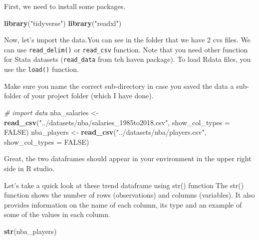 \documentclass[
]{book}
\newenvironment{Shaded}{\begin{snugshade}}{\end{snugshade}}
\newcommand{\AttributeTok}[1]{\textcolor[rgb]{0.13,0.29,0.53}{#1}}
\newcommand{\CommentTok}[1]{\textcolor[rgb]{0.56,0.35,0.01}{\textit{#1}}}
\newcommand{\ConstantTok}[1]{\textcolor[rgb]{0.56,0.35,0.01}{#1}}
\newcommand{\FunctionTok}[1]{\textcolor[rgb]{0.13,0.29,0.53}{\textbf{#1}}}
\newcommand{\NormalTok}[1]{#1}
\newcommand{\OtherTok}[1]{\textcolor[rgb]{0.56,0.35,0.01}{#1}}
\newcommand{\StringTok}[1]{\textcolor[rgb]{0.31,0.60,0.02}{#1}}
\begin{document}
First, we need to install some packages.

\begin{Shaded}
\begin{Highlighting}[]
\FunctionTok{library}\NormalTok{(}\StringTok{"tidyverse"}\NormalTok{)}
\FunctionTok{library}\NormalTok{(}\StringTok{"readxl"}\NormalTok{)}
\end{Highlighting}
\end{Shaded}

Now, let's import the data.You can see in the folder that we have 2 cvs files.
We can use \texttt{read\_delim()} or \texttt{read\_csv} function. Note that you need other function for Stata datasets (\texttt{read\_data} from teh haven package). To load Rdata files, you use the \texttt{load()} function.

Make sure you name the correct sub-directory in case you saved the data a sub-folder of your project folder (which I have done).

\begin{Shaded}
\begin{Highlighting}[]
\CommentTok{\# import data }
\NormalTok{nba\_salaries }\OtherTok{\textless{}{-}} \FunctionTok{read\_csv}\NormalTok{(}\StringTok{"../datasets/nba/salaries\_1985to2018.csv"}\NormalTok{, }\AttributeTok{show\_col\_types =} \ConstantTok{FALSE}\NormalTok{)}
\NormalTok{nba\_players }\OtherTok{\textless{}{-}} \FunctionTok{read\_csv}\NormalTok{(}\StringTok{"../datasets/nba/players.csv"}\NormalTok{, }\AttributeTok{show\_col\_types =} \ConstantTok{FALSE}\NormalTok{)}
\end{Highlighting}
\end{Shaded}

Great, the two dataframes should appear in your environment in the upper right side in R studio.

Let's take a quick look at these trend dataframe using str() function The str() function shows the number of rows (observations) and columns (variables). It also provides information on the name of each column, its type and an example of some of the values in each column.

\begin{Shaded}
\begin{Highlighting}[]
\FunctionTok{str}\NormalTok{(nba\_players)}
\end{Highlighting}
\end{Shaded}
\end{document}
